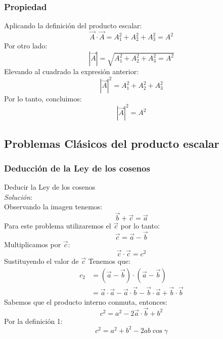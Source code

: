 \documentclass[12pt,openany]{book}
\begin{document}
		\subsubsection{Propiedad}
			Aplicando la definici\'on del producto escalar:\\
			\begin{equation*}
				\vec{A}\cdot\vec{A}=A_{1}^{2} + A_{2}^{2} + A_{3}^{2} =A^{2}	
			\end{equation*}
			Por otro lado:\\
			$$|\vec{A}|=\sqrt{A_{1}^{2} + A_{2}^{2} + A_{3}^{2} =A^{2}}$$
			Elevando al cuadrado la expresi\'on anterior:\\
			$$|\vec{A}|^{2}=A_{1}^{2} + A_{2}^{2} + A_{3}^{2}$$
			Por lo tanto, concluimos:
			$$|\vec{A}|^{2}=A^{2}$$

		\subsection{Problemas Cl\'asicos del producto escalar}
		
			\subsubsection{Deducci\'on de la Ley de los cosenos}
				\noindent Deducir la Ley de los cosenos\\
				\noindent\textsl{Soluci\'on}:\\
				Observando la imagen tenemos:
				$$\vec{b}+\vec{c}=\vec{a}$$
				Para este problema utilizaremos el $\vec{c}$ por lo tanto:\\
				$$\vec{c}=\vec{a}-\vec{b}$$
				Multiplicamos por $\vec{c}$:\\
				$$
					\vec{c}\cdot\vec{c}=c^{2}
				$$
				Sustituyendo el valor de $\vec{c}$
				Tenemos que:\\
				\begin{equation*}
					\begin{split}
						c_{2}&=(\vec{a}-\vec{b})\cdot(\vec{a}-\vec{b})\\
							&=\vec{a}\cdot\vec{a}-\vec{a}\cdot\vec{b}-
							\vec{b}\cdot\vec{a}+\vec{b}\cdot\vec{b}				
					\end{split}
				\end{equation*}
				Sabemos que el producto interno conmuta, entonces:\\
				$$c^{2}=a^{2}-2\vec{a}\cdot\vec{b}+b^{2} $$
				Por la definici\'on 1:\\
				$$c^{2}=a^{2}+b^{2}-2ab\cos\gamma $$
\end{document}
